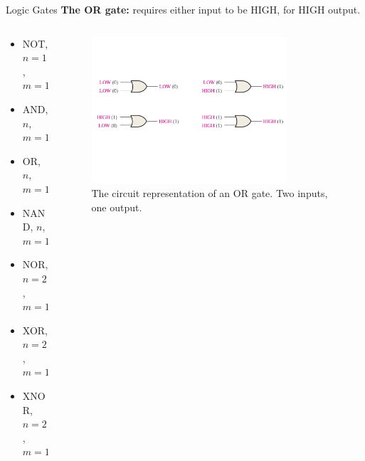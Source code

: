 \documentclass{beamer}
\begin{document}
\begin{frame}{Logic Gates}
\textbf{The OR gate:} requires either input to be HIGH, for HIGH output. \\ \vspace{0.5cm}
\begin{columns}[T]
\begin{column}{0.5\textwidth}
\begin{itemize}
\item \alert{NOT, $n=1$, $m=1$}
\item \alert{AND, $n$, $m=1$}
\item \alert{OR, $n$, $m=1$}
\item NAND, $n$, $m=1$
\item NOR, $n=2$, $m=1$
\item XOR, $n=2$, $m=1$
\item XNOR, $n=2$, $m=1$
\end{itemize}
\end{column}
\begin{column}{0.5\textwidth}
\begin{figure}
\centering
\includegraphics[width=0.8\textwidth,trim=0cm 5cm 0cm 5cm,clip=true]{figures/BasicOR.pdf}
\caption{\label{fig:or} The circuit representation of an OR gate.  Two inputs, one output.}
\end{figure}
\end{column}
\end{columns}
\end{frame}
\end{document}

